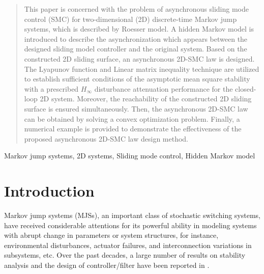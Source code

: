 \documentclass[conference]{IEEEtran}
\begin{document}




\maketitle

\begin{abstract}
	This paper is concerned with the problem of asynchronous sliding mode control (SMC) for two-dimensional (2D) discrete-time Markov jump systems, which is described by Roesser model.  A hidden Markov model is introduced to describe the asynchronization which appears between the designed sliding model controller and the original system. Based on the constructed 2D sliding surface, an asynchronous 2D-SMC law is designed. The Lyapunov function and Linear matrix inequality technique are utilized to establish sufficient conditions of the asymptotic mean square stability with a prescribed $H_{\infty}$ disturbance attenuation performance for the closed-loop 2D system. Moreover, the reachability of the constructed 2D sliding surface is ensured simultaneously. Then, the asynchronous 2D-SMC law can be obtained by solving a  convex optimization problem.  Finally, a numerical example is provided to demonstrate the  effectiveness of the proposed asynchronous 2D-SMC law design method.
\end{abstract}


\begin{IEEEkeywords}
	Markov jump systems, 2D systems, Sliding mode control, Hidden Markov model
\end{IEEEkeywords}



%
\IEEEpeerreviewmaketitle
  
   

\section{Introduction}
	Markov jump systems (MJSs), an important class of stochastic switching systems, have received considerable attentions for its powerful ability in modeling systems with abrupt change in parameters or system structures, for instance,  environmental disturbances, actuator failures, and interconnection variations in subsystems, etc. Over the past decades, a large number of results on stability analysis and the design of controller/filter have been reported in \cite{temp}.  
	
\end{document}
